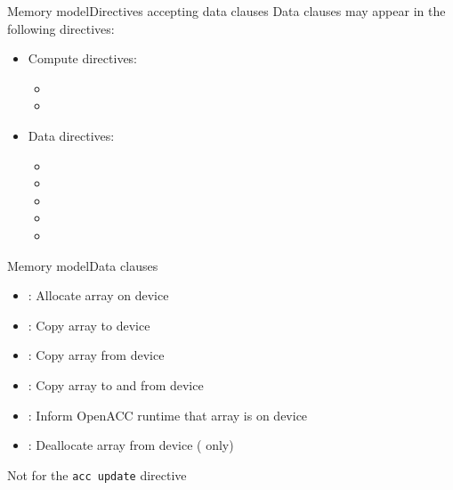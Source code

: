 \documentclass[12pt,aspectratio=169]{beamer}
\newcommand\shinline[2][]{\lstinline[style=shstyle,basicstyle=\ttfamily,#1]!#2!}
\begin{document}
\begin{frame}[fragile]{Memory model}{Directives accepting data clauses}
  Data clauses may appear in the following directives:
    \vspace\baselineskip
  \begin{itemize}
  \item Compute directives:
    \begin{itemize}
    \item{}
    \item{}
    \end{itemize}
    \vspace{.5\baselineskip}
  \item Data directives:
    \begin{itemize}
    \item {}
    \item {}
    \item {}
    \item {}
    \item {}
    \end{itemize}
  \end{itemize}
\end{frame}

\begin{frame}[fragile]{Memory model}{Data clauses}
  \begin{itemize}
  \item {}: Allocate array  on device
  \item {}: Copy array  to device
  \item {}: Copy array  from device
  \item {}: Copy array  to and from device
  \item {}: Inform OpenACC runtime that array  is on device
  \item {}: Deallocate array  from device ( only)
  \end{itemize}
  \vfill
  Not for the \shinline{acc update} directive
\end{frame}
\end{document}
